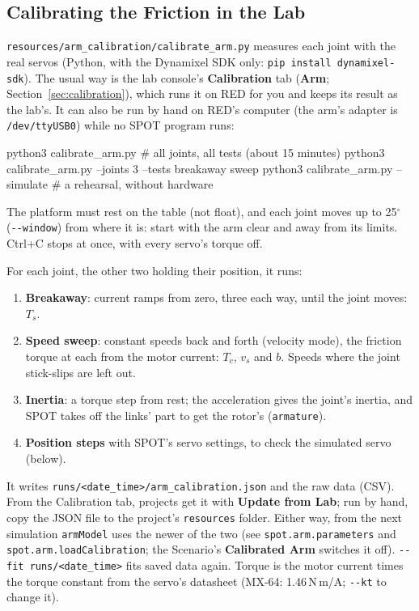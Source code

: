 \documentclass[11pt,a4paper]{article}
\newcommand{\ui}[1]{\textsf{\textbf{#1}}}
\newcommand{\pth}[1]{\texttt{#1}}
\newcommand{\fn}[1]{\texttt{#1}}
\begin{document}
\subsection{Calibrating the Friction in the Lab}
\pth{resources/arm\_calibration/calibrate\_arm.py} measures each joint with the real servos (Python, with the Dynamixel
SDK only: \fn{pip install dynamixel-sdk}). The usual way is the lab console's \ui{Calibration} tab (\ui{Arm};
Section~\ref{sec:calibration}), which runs it on RED for you and keeps its result as the lab's. It can also be run by
hand on RED's computer (the arm's adapter is \pth{/dev/ttyUSB0}) while no SPOT program runs:
\begin{shell}
python3 calibrate_arm.py                      # all joints, all tests (about 15 minutes)
python3 calibrate_arm.py --joints 3 --tests breakaway sweep
python3 calibrate_arm.py --simulate           # a rehearsal, without hardware
\end{shell}
\begin{warnbox}
The platform must rest on the table (not float), and each joint moves up to 25$^\circ$ (\fn{-{}-window}) from where it is:
start with the arm clear and away from its limits. Ctrl+C stops at once, with every servo's torque off.
\end{warnbox}
For each joint, the other two holding their position, it runs:
\begin{enumerate}
  \item \textbf{Breakaway}: current ramps from zero, three each way, until the joint moves: $T_s$.
  \item \textbf{Speed sweep}: constant speeds back and forth (velocity mode), the friction torque at each from the motor
        current: $T_c$, $v_s$ and $b$. Speeds where the joint stick-slips are left out.
  \item \textbf{Inertia}: a torque step from rest; the acceleration gives the joint's inertia, and SPOT takes off the
        links' part to get the rotor's (\fn{armature}).
  \item \textbf{Position steps} with SPOT's servo settings, to check the simulated servo (below).
\end{enumerate}
It writes \pth{runs/\allowbreak <date\_time>/\allowbreak arm\_calibration.json} and the raw data (CSV). From the Calibration tab, projects get
it with \ui{Update from Lab}; run by hand, copy the JSON file to the project's \pth{resources} folder. Either way, from
the next simulation \fn{armModel} uses the newer of the two (see \fn{spot.arm.\allowbreak parameters} and
\fn{spot.arm.\allowbreak loadCalibration}; the Scenario's \ui{Calibrated Arm} switches it off).
\fn{-{}-fit runs/<date\_time>} fits saved data again. Torque is the motor current times the torque constant from the
servo's datasheet (MX-64: 1.46\,N\,m/A; \fn{-{}-kt} to change it).
\end{document}
